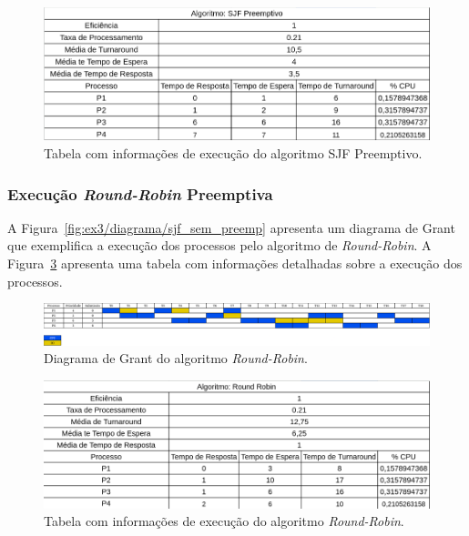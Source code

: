 \documentclass[
	12pt,				%
	oneside,   	        %
	a4paper,			%
	english,			%
	french,				%
	spanish,			%
	brazil,				%
	]{pacotes/abntex2}
\begin{document}
\begin{figure}[H]
  \centering
  \includegraphics[scale=0.5]{figuras/ex3/tabela/sjf_preemp.png}
  \caption{Tabela com informações de execução do algoritmo SJF Preemptivo.}
  \label{fig:ex3/tabela/sjf_preemp}
\end{figure}

\subsubsection{Execução \textit{Round-Robin} Preemptiva}
\label{subsubsec:rr}

A Figura~\ref{fig:ex3/diagrama/sjf_sem_preemp} apresenta um diagrama de Grant que exemplifica a execução dos processos pelo algoritmo de \textit{Round-Robin}. A Figura~\ref{fig:ex3/tabela/rr} apresenta uma tabela com informações detalhadas sobre a execução dos processos.

\begin{figure}[H]
  \centering
  \includegraphics[scale=0.20]{figuras/ex3/diagrama/rr.png}
  \caption{Diagrama de Grant do algoritmo \textit{Round-Robin}.}
  \label{fig:ex3/diagrama/rr}
\end{figure}

\begin{figure}[H]
  \centering
  \includegraphics[scale=0.5]{figuras/ex3/tabela/rr.png}
  \caption{Tabela com informações de execução do algoritmo \textit{Round-Robin}.}
  \label{fig:ex3/tabela/rr}
\end{figure}
\end{document}
